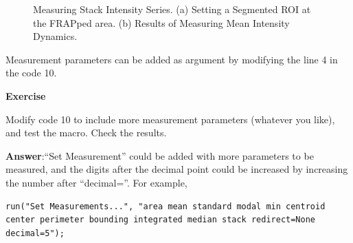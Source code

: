 \documentclass[11pt,a4paper,oneside]{report}
\newenvironment{indentexercise}[1]
{{\setlength{\leftmargin}{2em}}
\textbf{Exercise \thesubsection-#1}
\begin{list}{}
	\item
}
{\end{list}}
\begin{document}
\begin{figure}[htbp]
 \centering
 \quad
 \caption{Measuring Stack Intensity Series. (a) Setting a Segmented ROI at the FRAPped area. (b) Results of Measuring Mean Intensity Dynamics.}
 \label{fig:frapresults}
\end{figure}


Measurement parameters can be added as argument by modifying the line 4 in the code 10.

\begin{indentexercise}{1}
Modify code 10 to include more measurement parameters (whatever you like), and test the macro. Check the results. 

\item \textbf{Answer}:``Set Measurement'' could be added with more parameters to be measured, and the digits after the decimal point could be increased by increasing the number after ``decimal=''. For example, 
\begin{lstlisting}[numbers=none]
run("Set Measurements...", "area mean standard modal min centroid center perimeter bounding integrated median stack redirect=None decimal=5");
\end{lstlisting}

\end{indentexercise}
\end{document}
